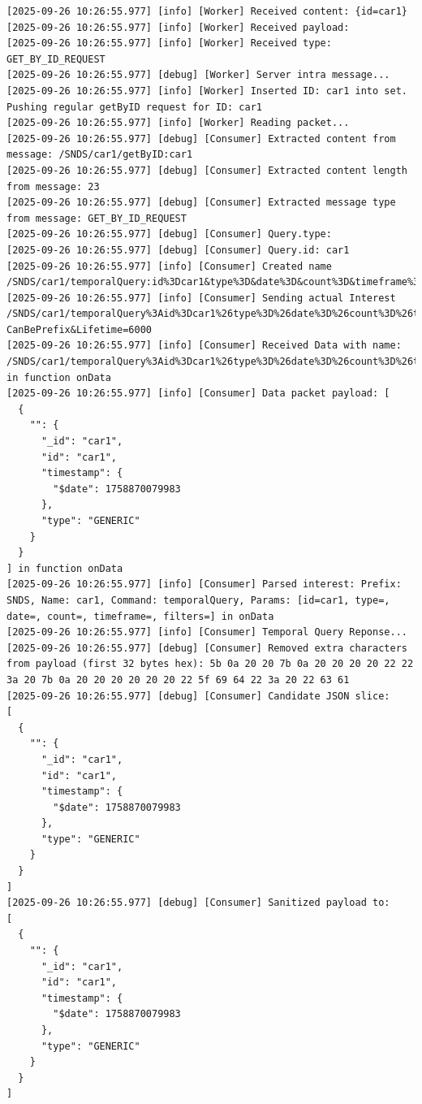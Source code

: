 \documentclass{article}
\begin{document}
\begin{lstlisting}[language=log, caption={}, label={}]
[2025-09-26 10:26:55.977] [info] [Worker] Received content: {id=car1}
[2025-09-26 10:26:55.977] [info] [Worker] Received payload: 
[2025-09-26 10:26:55.977] [info] [Worker] Received type: GET_BY_ID_REQUEST
[2025-09-26 10:26:55.977] [debug] [Worker] Server intra message...
[2025-09-26 10:26:55.977] [info] [Worker] Inserted ID: car1 into set. Pushing regular getByID request for ID: car1
[2025-09-26 10:26:55.977] [info] [Worker] Reading packet...
[2025-09-26 10:26:55.977] [debug] [Consumer] Extracted content from message: /SNDS/car1/getByID:car1
[2025-09-26 10:26:55.977] [debug] [Consumer] Extracted content length from message: 23
[2025-09-26 10:26:55.977] [debug] [Consumer] Extracted message type from message: GET_BY_ID_REQUEST
[2025-09-26 10:26:55.977] [debug] [Consumer] Query.type: 
[2025-09-26 10:26:55.977] [debug] [Consumer] Query.id: car1
[2025-09-26 10:26:55.977] [info] [Consumer] Created name /SNDS/car1/temporalQuery:id%3Dcar1&type%3D&date%3D&count%3D&timeframe%3D&filters%3D
[2025-09-26 10:26:55.977] [info] [Consumer] Sending actual Interest /SNDS/car1/temporalQuery%3Aid%3Dcar1%26type%3D%26date%3D%26count%3D%26timeframe%3D%26filters%3D?CanBePrefix&Lifetime=6000
[2025-09-26 10:26:55.977] [info] [Consumer] Received Data with name: /SNDS/car1/temporalQuery%3Aid%3Dcar1%26type%3D%26date%3D%26count%3D%26timeframe%3D%26filters%3D in function onData
[2025-09-26 10:26:55.977] [info] [Consumer] Data packet payload: [
  {
    "": {
      "_id": "car1",
      "id": "car1",
      "timestamp": {
        "$date": 1758870079983
      },
      "type": "GENERIC"
    }
  }
] in function onData
[2025-09-26 10:26:55.977] [info] [Consumer] Parsed interest: Prefix: SNDS, Name: car1, Command: temporalQuery, Params: [id=car1, type=, date=, count=, timeframe=, filters=] in onData
[2025-09-26 10:26:55.977] [info] [Consumer] Temporal Query Reponse...
[2025-09-26 10:26:55.977] [debug] [Consumer] Removed extra characters from payload (first 32 bytes hex): 5b 0a 20 20 7b 0a 20 20 20 20 22 22 3a 20 7b 0a 20 20 20 20 20 20 22 5f 69 64 22 3a 20 22 63 61 
[2025-09-26 10:26:55.977] [debug] [Consumer] Candidate JSON slice:
[
  {
    "": {
      "_id": "car1",
      "id": "car1",
      "timestamp": {
        "$date": 1758870079983
      },
      "type": "GENERIC"
    }
  }
]
[2025-09-26 10:26:55.977] [debug] [Consumer] Sanitized payload to:
[
  {
    "": {
      "_id": "car1",
      "id": "car1",
      "timestamp": {
        "$date": 1758870079983
      },
      "type": "GENERIC"
    }
  }
]
\end{lstlisting}
\end{document}
